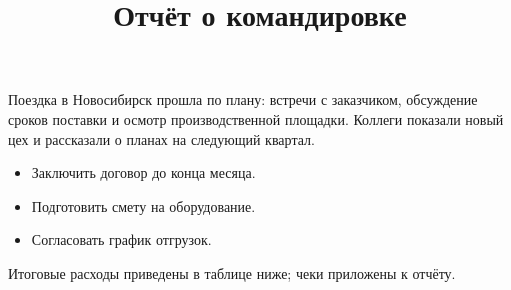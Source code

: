 \documentclass[11pt,a4paper]{article}
\title{Отчёт о командировке}
\begin{document}
\maketitle

Поездка в Новосибирск прошла по плану: встречи с заказчиком, обсуждение сроков поставки и осмотр производственной площадки. Коллеги показали новый цех и рассказали о планах на следующий квартал.

\begin{itemize}
\item Заключить договор до конца месяца.
\item Подготовить смету на оборудование.
\item Согласовать график отгрузок.
\end{itemize}

Итоговые расходы приведены в таблице ниже; чеки приложены к отчёту.
\end{document}
